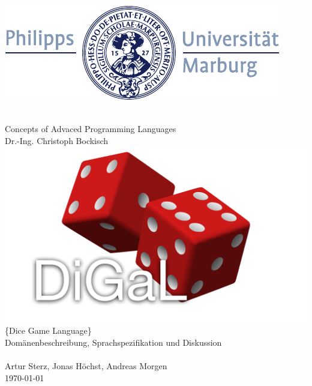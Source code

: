 \documentclass[a4paper, oneside]{book}
\begin{document}
	\begin{titlepage}
        \raggedright
        \includegraphics[width=.5\textwidth,right]{siegel.pdf}
        \begin{center}
            ~\\[2.5cm]
		    \Huge{Concepts of Advaced Programming Languages}
            ~\\[0.2cm]
            \large{Dr.-Ing. Christoph Bockisch}
            \large{}
            ~\\[3cm]
            \includegraphics[width=\textwidth]{Logo.pdf}
		    \Large{\{Dice Game Language\}}\\
		    \large{Domänenbeschreibung, Sprachspezifikation und Diskussion}\\
            ~\\[1cm]
		    \large{Artur Sterz, Jonas Höchst, Andreas Morgen}\\
		    \large{\today}

        \end{center}
	\end{titlepage}
	\tableofcontents
	\newpage











	
\end{document}
